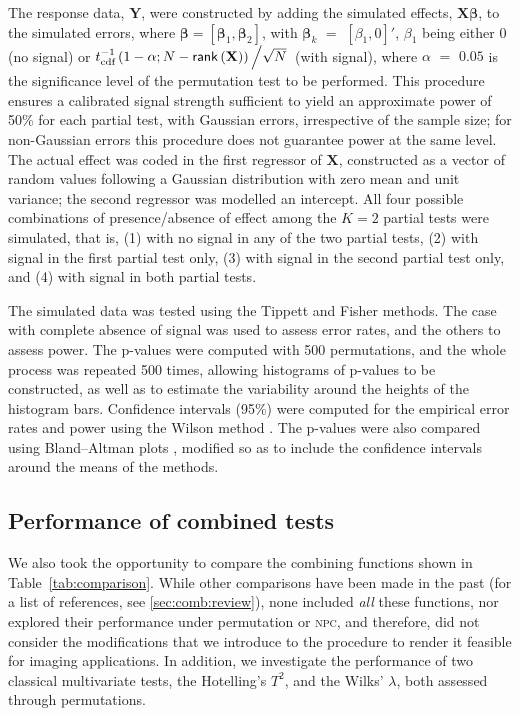 The response data, $\mathbf{Y}$, were constructed by adding the simulated effects, $\mathbf{X}\boldsymbol{\beta}$, to the simulated errors, where $\boldsymbol{\beta} = \left[\boldsymbol{\beta}_1,\boldsymbol{\beta}_2\right]$, with $\boldsymbol{\beta}_k$ $=$ $[\beta_1, 0]'$, $\beta_1$ being either 0 (no signal) or $t^{-1}_{\text{cdf}}\left(1-\alpha ; N-\mathsf{rank}\left(\mathbf{X}\right)\right)\left/\sqrt{N}\right.$ (with signal), where $\alpha$ $=$ $0.05$ is the significance level of the permutation test to be performed. This procedure ensures a calibrated signal strength sufficient to yield an approximate power of 50\% for each partial test, with Gaussian errors, irrespective of the sample size; for non-Gaussian errors this procedure does not guarantee power at the same level. The actual effect was coded in the first regressor of $\mathbf{X}$, constructed as a vector of random values following a Gaussian distribution with zero mean and unit variance; the second regressor was modelled an intercept. All four possible combinations of presence/absence of effect among the $K=2$ partial tests were simulated, that is, (1) with no signal in any of the two partial tests, (2) with signal in the first partial test only, (3) with signal in the second partial test only, and (4) with signal in both partial tests.

The simulated data was tested using the Tippett and Fisher methods. The case with complete absence of signal was used to assess error rates, and the others to assess power. The p-values were computed with 500 permutations, and the whole process was repeated 500 times, allowing histograms of p-values to be constructed, as well as to estimate the variability around the heights of the histogram bars. Confidence intervals (95\%) were computed for the empirical error rates and power using the Wilson method \citep{Wilson1927}. The p-values were also compared using Bland--Altman plots \citep{Bland1986}, modified so as to include the confidence intervals around the means of the methods.

\subsection{Performance of combined tests}

We also took the opportunity to compare the combining functions shown in Table~\ref{tab:comparison}. While other comparisons have been made in the past (for a list of references, see \ref{sec:comb:review}), none included \emph{all} these functions, nor explored their performance under permutation or \textsc{npc}, and therefore, did not consider the modifications that we introduce to the procedure to render it feasible for imaging applications. In addition, we investigate the performance of two classical multivariate tests, the Hotelling's $T^2$, and the Wilks' $\lambda$, both assessed through permutations.

